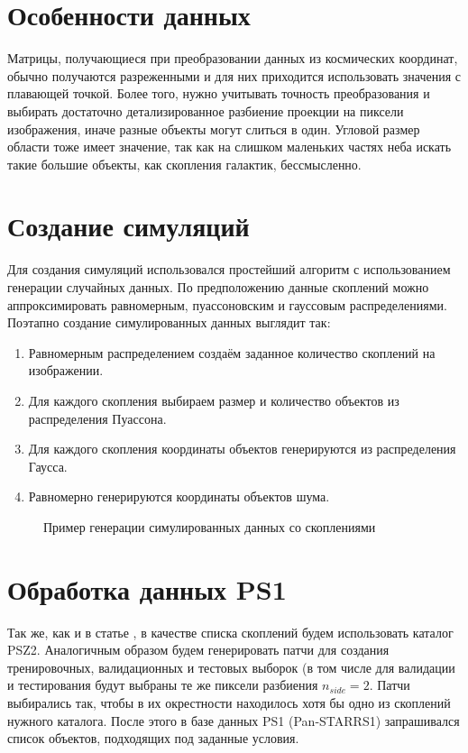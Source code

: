 \section{Особенности данных}
Матрицы, получающиеся при преобразовании данных из космических 
координат, обычно получаются разреженными и для них приходится использовать значения с плавающей 
точкой. Более того, нужно учитывать точность преобразования и выбирать достаточно детализированное 
разбиение проекции на пиксели изображения, иначе разные объекты могут слиться в один. Угловой 
размер области тоже имеет значение, так как на слишком маленьких частях неба искать такие большие 
объекты, как скопления галактик, бессмысленно.\\


\section{Создание симуляций}
Для создания симуляций использовался простейший алгоритм с использованием генерации случайных 
данных. По предположению данные скоплений можно аппроксимировать равномерным, пуассоновским и 
гауссовым распределениями.
Поэтапно создание симулированных данных выглядит так:

\begin{enumerate}
	\item Равномерным распределением создаём заданное количество скоплений на изображении.
	\item Для каждого скопления выбираем размер и количество объектов из распределения Пуассона.
	\item Для каждого скопления координаты объектов генерируются из распределения Гаусса.
	\item Равномерно генерируются координаты объектов шума.
\end{enumerate}

\begin{figure}[h]
    \caption{Пример генерации симулированных данных со скоплениями}
\end{figure}


\section{Обработка данных PS1}
Так же, как и в статье \cite{Bonjean}, в качестве списка скоплений будем использовать каталог PSZ2. 
Аналогичным образом будем генерировать патчи для создания тренировочных, валидационных и тестовых 
выборок (в том числе для валидации и тестирования будут выбраны те же пиксели разбиения $n_{side}=2$. 
Патчи выбирались так, чтобы в их окрестности находилось хотя бы одно из скоплений нужного каталога. 
После этого в базе данных PS1 (Pan-STARRS1) запрашивался список объектов, подходящих под заданные 
условия. \\

